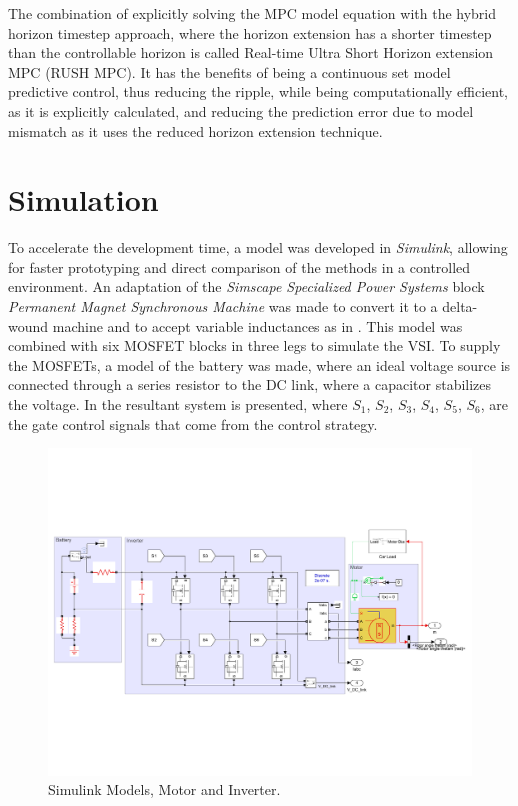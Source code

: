\documentclass[9pt,conference]{IEEEtran}
\begin{document}
The combination of explicitly solving the MPC model equation with the hybrid horizon timestep approach, where the horizon extension has a shorter timestep than the controllable horizon is called Real-time Ultra Short Horizon extension MPC (RUSH MPC). It has the benefits of being a continuous set model predictive control, thus reducing the ripple, while being computationally efficient, as it is explicitly calculated, and reducing the prediction error due to model mismatch as it uses the reduced horizon extension technique.

\section{Simulation}
\label{section:simulation}%

To accelerate the development time, a model was developed in \textit{Simulink}, allowing for faster prototyping and direct comparison of the methods in a controlled environment. An adaptation of the \textit{Simscape Specialized Power Systems} block \textit{Permanent Magnet Synchronous Machine} was made to convert it to a delta-wound machine and to accept variable inductances as in . 
This model was combined with six MOSFET blocks in three legs to simulate the VSI. To supply the MOSFETs, a model of the battery was made, where an ideal voltage source is connected through a series resistor to the DC link, where a capacitor stabilizes the voltage. In  the resultant system is presented, where $S_1$, $S_2$, $S_3$, $S_4$, $S_5$, $S_6$, are the gate control signals that come from the control strategy.

\begin{figure}[htb]
	\centering
		\includegraphics[clip, trim=0.3cm 5cm 0.5cm 5cm, width=.8\linewidth]{Figures/motor_and_inverter_simulink1.pdf}
	\caption[Simulink Models, Motor and Inverter.]{Simulink Models, Motor and Inverter.}
	\label{fig:simulation_model} %
\end{figure}
\end{document}
